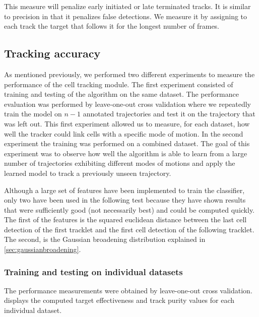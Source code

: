 	This measure will penalize early initiated or late terminated tracks. It is similar to precision in that it penalizes false detections. We measure it by assigning to each track the target that follows it for the longest number of frames. 
	
	\subsection{Tracking accuracy \statusfirstdraft}
	
	
		As mentioned previously, we performed two different experiments to measure the performance of the cell tracking module. The first experiment consisted of training and testing of the algorithm on the same dataset. The performance evaluation was performed by leave-one-out cross validation where we repeatedly train the model on $n-1$ annotated trajectories and test it on the trajectory that was left out. This first experiment allowed us to measure, for each dataset, how well the tracker could link cells with a specific mode of motion. In the second experiment the training was performed on a combined dataset. The goal of this experiment was to observe how well the algorithm is able to learn from a large number of trajectories exhibiting different modes of motions and apply the learned model to track a previously unseen trajectory.
		
		Although a large set of features have been implemented to train the classifier, only two have been used in the following test because they have shown results that were sufficiently good (not necessarily best) and could be computed quickly. The first of the features is the squared euclidean distance between the last cell detection of the first tracklet and the first cell detection of the following tracklet. The second, is the Gaussian broadening distribution explained in \cref{sec:gaussianbroadening}.
	
		\subsubsection{Training and testing on individual datasets \statusfirstdraft}
		
		The performance measurements were obtained by leave-one-out cross validation.  displays the computed target effectiveness and track purity values for each individual dataset.
		
